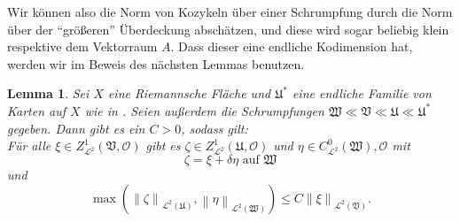 \documentclass[11pt,a4paper,toc=bibliography]{scrartcl}
\theoremstyle{def}
\theoremstyle{thm}
\newtheorem{lemma}[defi]{Lemma}
\theoremstyle{remark}
\newcommand*{\norm}[1]{\left\lVert#1\right\rVert} %
\begin{document}
Wir können also die Norm von Kozykeln über einer Schrumpfung durch die Norm über der "`größeren"' Überdeckung abschätzen, und diese wird sogar beliebig klein respektive dem Vektorraum $A$. Dass dieser eine endliche Kodimension hat, werden wir im Beweis des nächsten Lemmas benutzen.


\begin{lemma}
Sei $X$ eine Riemannsche Fläche und $\mathfrak{U}^*$ eine endliche Familie von Karten auf $X$ wie in . 
Seien außerdem die Schrumpfungen $\mathfrak{W}\ll\mathfrak{V}\ll\mathfrak{U}\ll\mathfrak{U}^*$ gegeben.
Dann gibt es ein $C>0$, sodass gilt:\\
Für alle $\xi\in Z^1_{\mathcal{L}^2}(\mathfrak{V},\mathcal{O})$ gibt es $\zeta\in Z^1_{\mathcal{L}^2}(\mathfrak{U},\mathcal{O})$ und $\eta\in C^0_{\mathcal{L}^2}(\mathfrak{W}),\mathcal{O}$ mit
\[
\zeta = \xi+\delta\eta \text{ auf } \mathfrak{W}
\]
und
\[
\max\left( \norm{\zeta}_{\mathcal{L}^2(\mathfrak{U})},\norm{\eta}_{\mathcal{L}^2(\mathfrak{W})}\right)\leq C\norm{\xi}_{\mathcal{L}^2(\mathfrak{V})}.
\]
\end{lemma}
\end{document}

